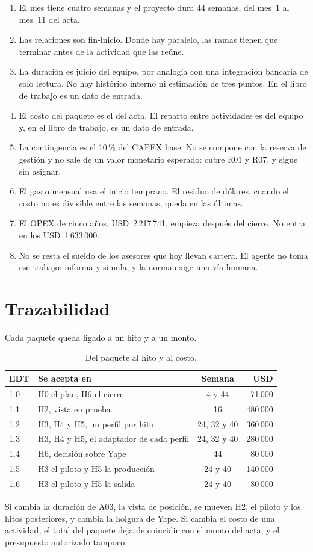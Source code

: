 \documentclass[11pt,a4paper]{article}
\newcommand{\usd}[1]{USD~#1}
\begin{document}
\begin{enumerate}
  \item El mes tiene cuatro semanas y el proyecto dura 44 semanas, del mes~1 al mes~11 del acta.
  \item Las relaciones son fin-inicio. Donde hay paralelo, las ramas tienen que terminar antes de la actividad que las reúne.
  \item La duración es juicio del equipo, por analogía con una integración bancaria de solo lectura. No hay histórico interno ni estimación de tres puntos. En el libro de trabajo es un dato de entrada.
  \item El costo del paquete es el del acta. El reparto entre actividades es del equipo y, en el libro de trabajo, es un dato de entrada.
  \item La contingencia es el 10\,\% del CAPEX base. No se compone con la reserva de gestión y no sale de un valor monetario esperado: cubre R01 y R07, y sigue sin asignar.
  \item El gasto mensual usa el inicio temprano. El residuo de dólares, cuando el costo no es divisible entre las semanas, queda en las últimas.
  \item El OPEX de cinco años, \usd{2\,217\,741}, empieza después del cierre. No entra en los \usd{1\,633\,000}.
  \item No se resta el sueldo de los asesores que hoy llevan cartera. El agente no toma ese trabajo: informa y simula, y la norma exige una vía humana.
\end{enumerate}

\section{Trazabilidad}

Cada paquete queda ligado a un hito y a un monto.

\begin{table}[H]
\centering
\caption{Del paquete al hito y al costo.}
\small
\begin{tabularx}{\textwidth}{@{}l X c r@{}}
\toprule
\textbf{EDT} & \textbf{Se acepta en} & \textbf{Semana} & \textbf{USD} \\
\midrule
1.0 & H0 el plan, H6 el cierre & 4 y 44 & 71\,000 \\
1.1 & H2, vista en prueba & 16 & 480\,000 \\
1.2 & H3, H4 y H5, un perfil por hito & 24, 32 y 40 & 360\,000 \\
1.3 & H3, H4 y H5, el adaptador de cada perfil & 24, 32 y 40 & 280\,000 \\
1.4 & H6, decisión sobre Yape & 44 & 80\,000 \\
1.5 & H3 el piloto y H5 la producción & 24 y 40 & 140\,000 \\
1.6 & H3 el piloto y H5 la salida & 24 y 40 & 80\,000 \\
\bottomrule
\end{tabularx}
\end{table}

Si cambia la duración de A03, la vista de posición, se mueven H2, el piloto y los hitos posteriores, y cambia la holgura de Yape. Si cambia el costo de una actividad, el total del paquete deja de coincidir con el monto del acta, y el presupuesto autorizado tampoco.
\end{document}
